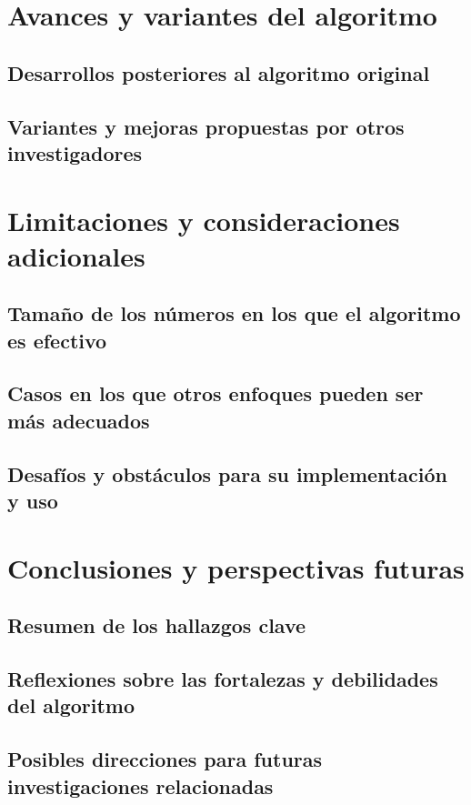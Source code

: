 \documentclass{article}
\begin{document}
\section{Avances y variantes del algoritmo}
    \subsection{Desarrollos posteriores al algoritmo original}
    \subsection{Variantes y mejoras propuestas por otros investigadores}
    
\section{Limitaciones y consideraciones adicionales}
    \subsection{Tamaño de los números en los que el algoritmo es efectivo}
    \subsection{Casos en los que otros enfoques pueden ser más adecuados}
    \subsection{Desafíos y obstáculos para su implementación y uso}
    
\section{Conclusiones y perspectivas futuras}
    \subsection{Resumen de los hallazgos clave}
    \subsection{Reflexiones sobre las fortalezas y debilidades del algoritmo}
    \subsection{Posibles direcciones para futuras investigaciones relacionadas}

\newpage
\end{document}
